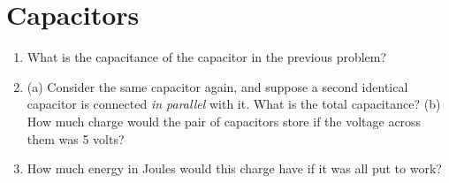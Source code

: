 \documentclass[10pt]{article}
\begin{document}
\section{Capacitors}

\begin{enumerate}
\item What is the capacitance of the capacitor in the previous problem? \\ \vspace{1cm}
\item (a) Consider the same capacitor again, and suppose a second identical capacitor is connected \textit{in parallel} with it.  What is the total capacitance? (b) How much charge would the pair of capacitors store if the voltage across them was 5 volts? \\ \vspace{1.5cm}
\item How much energy in Joules would this charge have if it was all put to work?
\end{enumerate}
\end{document}
